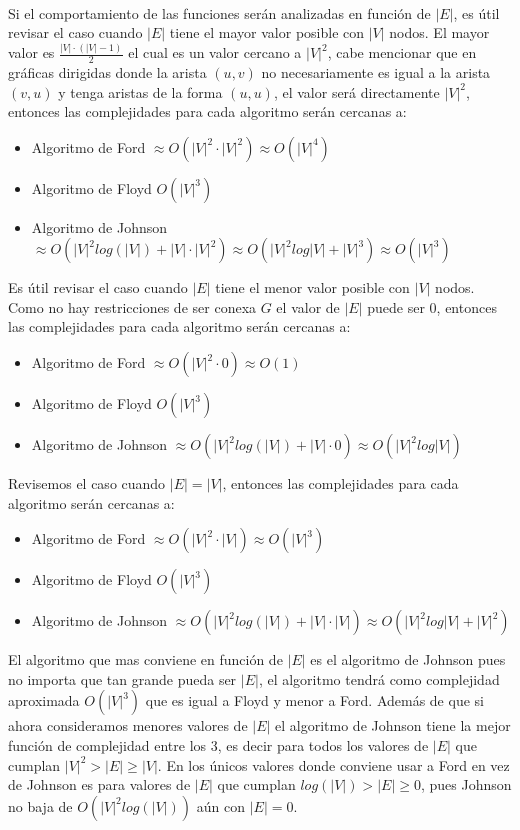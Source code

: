 \documentclass[12pt]{article}
\begin{document}
\paragraph{} Si el comportamiento de las funciones serán analizadas en función de $|E|$, es útil revisar el caso cuando $|E|$ tiene el mayor valor posible con $|V|$ nodos. El mayor valor es $\frac{|V|\cdot(|V| - 1)}{2}$ el cual es un valor cercano a $|V|^{2}$, cabe mencionar que en gráficas dirigidas donde la arista $(u, v)$ no necesariamente es igual a la arista $(v, u)$ y tenga aristas de la forma $(u, u)$, el valor será directamente $|V|^{2}$, entonces las complejidades para cada algoritmo serán cercanas a:\\
 \begin{itemize}
	\item Algoritmo de Ford $\approx O(|V|^{2}\cdot|V|^{2}) \approx O(|V|^{4})$
	\item Algoritmo de Floyd $O(|V|^{3})$
	\item Algoritmo de Johnson $\approx O(|V|^{2}log(|V|) + |V| \cdot|V|^{2}) \approx O(|V|^{2}log|V| + |V|^{3}) \approx O(|V|^{3})$ 
\end{itemize}
Es útil revisar el caso cuando $|E|$ tiene el menor valor posible con $|V|$ nodos. Como no hay restricciones de ser conexa $G$ el valor de $|E|$ puede ser $0$, entonces las complejidades para cada algoritmo serán cercanas a:\\
\begin{itemize}
	\item Algoritmo de Ford $\approx O(|V|^{2}\cdot 0) \approx O(1)$
	\item Algoritmo de Floyd $O(|V|^{3})$
	\item Algoritmo de Johnson $\approx O(|V|^{2}log(|V|) + |V| \cdot0) \approx O(|V|^{2}log|V|)$
\end{itemize}
Revisemos el caso cuando $|E| = |V|$, entonces las complejidades para cada algoritmo serán cercanas a:\\
\begin{itemize}
	\item Algoritmo de Ford $\approx O(|V|^{2}\cdot |V|) \approx O(|V|^{3})$
	\item Algoritmo de Floyd $O(|V|^{3})$
	\item Algoritmo de Johnson $\approx O(|V|^{2}log(|V|) + |V| \cdot|V|) \approx O(|V|^{2}log|V| + |V|^{2})$
\end{itemize}
El algoritmo que mas conviene en función de $|E|$ es el algoritmo de Johnson pues no importa que tan grande pueda ser $|E|$, el algoritmo tendrá como complejidad aproximada $O(|V|^{3})$ que es igual a Floyd y menor a Ford. Además de que si ahora consideramos menores valores de $|E|$ el algoritmo de Johnson tiene la mejor función de complejidad entre los 3, es decir para todos los valores de $|E|$ que cumplan $|V|^{2} > |E| \geq |V|$. En los únicos valores donde conviene usar a Ford en vez de Johnson es para valores de $|E|$ que cumplan $log(|V|) > |E| \geq 0$, pues Johnson no baja de $O(|V|^{2}log(|V|))$ aún con $|E| = 0$.
\end{document}

